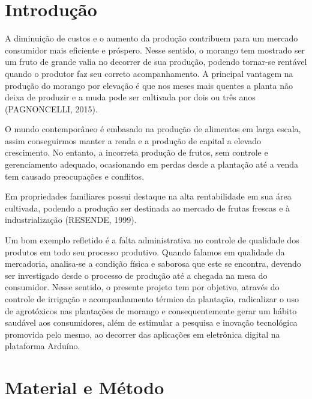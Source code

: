 \documentclass[article,12pt,onesidea,4paper,english,brazil]{abntex2}
\begin{document}
	\section*{Introdução}
	
	A diminuição de custos e o aumento da produção contribuem para um mercado consumidor mais eficiente e próspero. Nesse sentido, o morango tem mostrado ser um fruto de grande valia no decorrer de sua produção, podendo tornar-se rentável quando o produtor faz seu correto acompanhamento. A principal vantagem na produção do morango por elevação é que nos meses mais quentes a planta não deixa de produzir e a muda pode ser cultivada por dois ou três anos (PAGNONCELLI, 2015).
	
	O mundo contemporâneo é embasado na produção de alimentos em larga escala, assim conseguirmos manter a renda e a produção de capital a elevado crescimento. No entanto, a incorreta produção de frutos, sem controle e gerenciamento adequado, ocasionando em perdas desde a plantação até a venda tem causado preocupações e conflitos.
	
	Em propriedades familiares possui destaque na alta rentabilidade em sua área cultivada, podendo a produção ser destinada ao mercado de frutas frescas e à industrialização (RESENDE, 1999).
	
	Um bom exemplo refletido é a falta administrativa no controle de qualidade dos produtos em todo seu processo produtivo. Quando falamos em qualidade da mercadoria, analisa-se a condição física e saborosa que este se encontra, devendo ser investigado desde o processo de produção até a chegada na mesa do consumidor. Nesse sentido, o presente projeto tem por objetivo, através do controle de irrigação e acompanhamento térmico da plantação, radicalizar o uso de agrotóxicos nas plantações de morango e consequentemente gerar um hábito saudável aos consumidores, além de estimular a pesquisa e inovação tecnológica promovida pelo mesmo, ao decorrer das aplicações em eletrônica digital na plataforma Arduíno.
	
	\section*{Material e Método}
	
\end{document}
